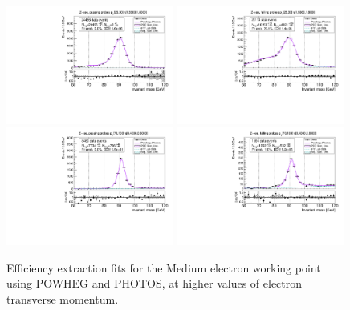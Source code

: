 {\begin{figure}
\centering
\includegraphics[width=0.49\textwidth]{figures/Zee_PowhegPhotos_BkgLPiEMu_pass_ptBin3_etaBin23.pdf}
\includegraphics[width=0.49\textwidth]{figures/Zee_PowhegPhotos_BkgLPiEMu_fail_ptBin3_etaBin23.pdf}
\includegraphics[width=0.49\textwidth]{figures/Zee_PowhegPhotos_BkgLPiEMu_pass_ptBin14_etaBin17.pdf}
\includegraphics[width=0.49\textwidth]{figures/Zee_PowhegPhotos_BkgLPiEMu_fail_ptBin14_etaBin17.pdf}
\caption{Efficiency extraction fits for the Medium electron working point using POWHEG and PHOTOS, at higher values of electron transverse momentum.}
\label{fig:ZeeAltSigFSRFits4}
\end{figure}


}
